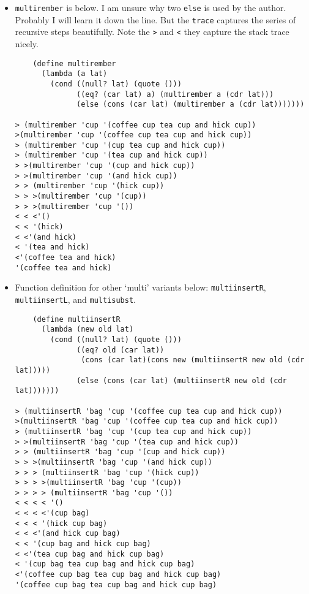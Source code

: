 \documentclass[11pt]{article}
\begin{document}
\begin{itemize}
\begin{verbatim}
\end{verbatim}
\item \texttt{multirember} is below. I am unsure why two \texttt{else} is used by the author. Probably I will learn it down the line. But the
\texttt{trace} captures the series of recursive steps beautifully. Note the \texttt{>} and \texttt{<} they capture the stack trace nicely.
\begin{verbatim}
    (define multirember
      (lambda (a lat)
        (cond ((null? lat) (quote ()))
              ((eq? (car lat) a) (multirember a (cdr lat)))
              (else (cons (car lat) (multirember a (cdr lat)))))))

> (multirember 'cup '(coffee cup tea cup and hick cup))
>(multirember 'cup '(coffee cup tea cup and hick cup))
> (multirember 'cup '(cup tea cup and hick cup))
> (multirember 'cup '(tea cup and hick cup))
> >(multirember 'cup '(cup and hick cup))
> >(multirember 'cup '(and hick cup))
> > (multirember 'cup '(hick cup))
> > >(multirember 'cup '(cup))
> > >(multirember 'cup '())
< < <'()
< < '(hick)
< <'(and hick)
< '(tea and hick)
<'(coffee tea and hick)
'(coffee tea and hick)

\end{verbatim}
\item Function definition for other `multi' variants below: \texttt{multiinsertR}, \texttt{multiinsertL}, and \texttt{multisubst}.
\begin{verbatim}
    (define multiinsertR
      (lambda (new old lat)
        (cond ((null? lat) (quote ()))
              ((eq? old (car lat))
               (cons (car lat)(cons new (multiinsertR new old (cdr lat)))))
              (else (cons (car lat) (multiinsertR new old (cdr lat)))))))

> (multiinsertR 'bag 'cup '(coffee cup tea cup and hick cup))
>(multiinsertR 'bag 'cup '(coffee cup tea cup and hick cup))
> (multiinsertR 'bag 'cup '(cup tea cup and hick cup))
> >(multiinsertR 'bag 'cup '(tea cup and hick cup))
> > (multiinsertR 'bag 'cup '(cup and hick cup))
> > >(multiinsertR 'bag 'cup '(and hick cup))
> > > (multiinsertR 'bag 'cup '(hick cup))
> > > >(multiinsertR 'bag 'cup '(cup))
> > > > (multiinsertR 'bag 'cup '())
< < < < '()
< < < <'(cup bag)
< < < '(hick cup bag)
< < <'(and hick cup bag)
< < '(cup bag and hick cup bag)
< <'(tea cup bag and hick cup bag)
< '(cup bag tea cup bag and hick cup bag)
<'(coffee cup bag tea cup bag and hick cup bag)
'(coffee cup bag tea cup bag and hick cup bag)

\end{verbatim}


\end{itemize}
\end{document}
